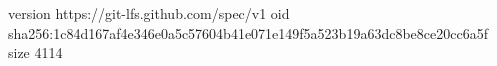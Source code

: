 version https://git-lfs.github.com/spec/v1
oid sha256:1c84d167af4e346e0a5c57604b41e071e149f5a523b19a63dc8be8ce20cc6a5f
size 4114

